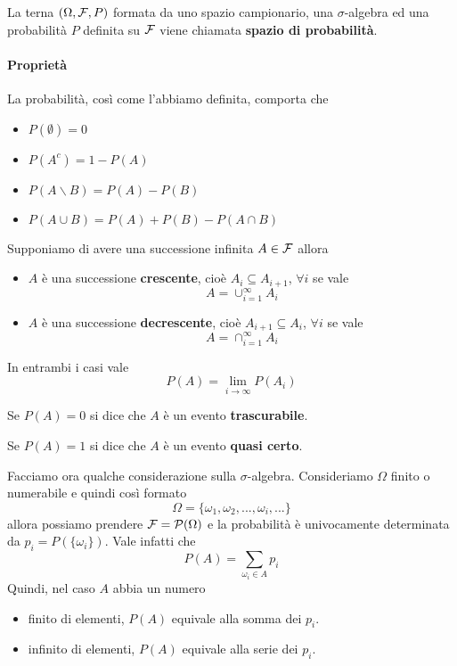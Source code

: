 \begin{definition}
	La terna $(\Omega, \mathcal{F}, P)$ formata da uno spazio campionario, una $\sigma$-algebra ed una
	probabilità $P$ definita su $\mathcal{F}$ viene chiamata \textbf{spazio di probabilità}.
\end{definition}

\paragraph{Proprietà} La probabilità, così come l'abbiamo definita, comporta che
\begin{itemize}
	\item $P(\emptyset) = 0$
	\item $P(A^c) = 1 - P(A)$
	\item $P(A \backslash B) = P(A) - P(B)$
	\item $P(A \cup B) = P(A) + P(B) - P(A \cap B)$
\end{itemize}

\begin{proposition}
	Supponiamo di avere una successione infinita $A \in \mathcal{F}$	allora
	\begin{itemize}
		\item $A$ è una successione \textbf{crescente}, cioè $A_i \subseteq A_{i+1}$, $\forall i$
		      se vale
		      \[ A = \cup_{i=1}^\infty A_i \]
		\item $A$ è una successione \textbf{decrescente}, cioè $A_{i+1} \subseteq A_i$,
		      $\forall i$ se vale
		      \[ A = \cap_{i=1}^\infty A_i \]
	\end{itemize}
	In entrambi i casi vale
	\[ P(A) = \lim_{i \to \infty} P(A_i) \]
\end{proposition}

\begin{definition}
	Se $P(A) = 0$ si dice che $A$ è un evento \textbf{trascurabile}.
\end{definition}

\begin{definition}
	Se $P(A) = 1$ si dice che $A$ è un evento \textbf{quasi certo}.
\end{definition}

Facciamo ora qualche considerazione sulla $\sigma$-algebra. Consideriamo $\Omega$ finito o
numerabile e quindi così formato
\[ \Omega = \{ \omega_1, \omega_2, ..., \omega_i, ... \} \]
allora possiamo prendere $\mathcal{F} = \mathcal{P}(\Omega)$ e la probabilità è univocamente determinata
da $p_i = P(\{ \omega_i \})$. Vale infatti che
\[ P(A) = \sum_{\omega_i \in A} p_i \]
Quindi, nel caso $A$ abbia un numero
\begin{itemize}
	\item finito di elementi, $P(A)$ equivale alla somma dei $p_i$.
	\item infinito di elementi, $P(A)$ equivale alla serie dei $p_i$.
\end{itemize}

